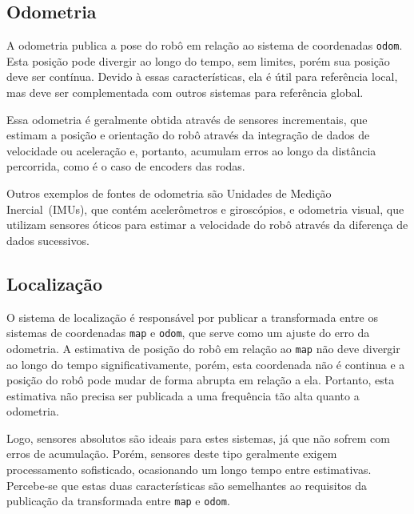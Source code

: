 \documentclass[repeatfields,xlists,xpacks,oneside,yearsonly]{ufrgscca}
\begin{document}

\subsection{Odometria}

A odometria publica a pose do robô em relação ao sistema de
coordenadas \texttt{odom}. Esta posição pode divergir ao longo do
tempo, sem limites, porém sua posição deve ser contínua. Devido à
essas características, ela é útil para referência local, mas deve ser
complementada com outros sistemas para referência global.

Essa odometria é geralmente obtida através de sensores incrementais,
que estimam a posição e orientação do robô através da integração de
dados de velocidade ou aceleração e, portanto, acumulam erros ao
longo da distância percorrida, como é o caso de encoders das rodas.

Outros exemplos de fontes de odometria são Unidades de Medição
Inercial~(IMUs), que contém acelerômetros e giroscópios, e odometria
visual, que utilizam sensores óticos para estimar a velocidade do
robô através da diferença de dados sucessivos.


\subsection{Localização}

O sistema de localização é responsável por publicar a transformada
entre os sistemas de coordenadas \texttt{map} e \texttt{odom}, que
serve como um ajuste do erro da odometria. A estimativa de posição do
robô em relação ao \texttt{map} não deve divergir ao longo do tempo
significativamente, porém, esta coordenada não é continua e a posição
do robô pode mudar de forma abrupta em relação a ela. Portanto, esta
estimativa não precisa ser publicada a uma frequência tão alta quanto
a odometria.

Logo, sensores absolutos são ideais para estes sistemas, já que não
sofrem com erros de acumulação. Porém, sensores deste tipo geralmente
exigem processamento sofisticado, ocasionando um longo tempo entre
estimativas. Percebe-se que estas duas características são
semelhantes ao requisitos da publicação da transformada entre
\texttt{map} e \texttt{odom}.
\end{document}
